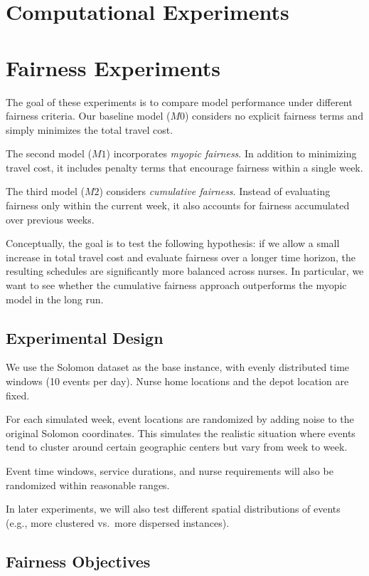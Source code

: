 \section{Computational Experiments}

\section{Fairness Experiments}

The goal of these experiments is to compare model performance under different fairness criteria. 
Our baseline model ($M0$) considers no explicit fairness terms and simply minimizes the total travel cost.

The second model ($M1$) incorporates \emph{myopic fairness}. In addition to minimizing travel cost, it includes penalty terms that encourage fairness within a single week.

The third model ($M2$) considers \emph{cumulative fairness}. Instead of evaluating fairness only within the current week, it also accounts for fairness accumulated over previous weeks.

Conceptually, the goal is to test the following hypothesis: if we allow a small increase in total travel cost and evaluate fairness over a longer time horizon, the resulting schedules are significantly more balanced across nurses. In particular, we want to see whether the cumulative fairness approach outperforms the myopic model in the long run.

\subsection{Experimental Design}

We use the Solomon dataset as the base instance, with evenly distributed time windows (10 events per day). Nurse home locations and the depot location are fixed.

For each simulated week, event locations are randomized by adding noise to the original Solomon coordinates. This simulates the realistic situation where events tend to cluster around certain geographic centers but vary from week to week.

Event time windows, service durations, and nurse requirements will also be randomized within reasonable ranges.

In later experiments, we will also test different spatial distributions of events (e.g., more clustered vs.\ more dispersed instances).

\subsection{Fairness Objectives}

